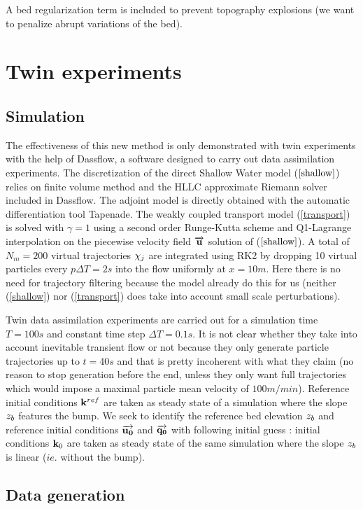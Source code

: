 A bed regularization term is included to prevent topography explosions (we want to penalize abrupt variations of the bed).

\clearpage
\section{Twin experiments}

\subsection{Simulation}

The effectiveness of this new method is only demonstrated with twin experiments with the help of Dassflow,
a software designed to carry out data assimilation experiments.
The discretization of the direct Shallow Water model ($\ref{shallow}$) relies on finite volume method and the HLLC approximate Riemann solver included in Dassflow.
The adjoint model is directly obtained with the automatic differentiation tool Tapenade.
The weakly coupled transport model (\ref{transport}) is solved with $\gamma = 1$ using a second order Runge-Kutta scheme and Q1-Lagrange interpolation on the piecewise velocity field $\overrightarrow{\mathbf{u}}$ solution of ($\ref{shallow}$).
A total of $N_m = 200$ virtual trajectories $\mathbf{\chi}_j$ are integrated using RK2 by dropping 10 virtual particles every $p\Delta T = 2s$ into the flow uniformly at $x=10m$.
Here there is no need for trajectory filtering because the model already do this for us (neither (\ref{shallow}) nor (\ref{transport}) does take into account small scale perturbations).


\vskip 0.3cm
Twin data assimilation experiments are carried out for a simulation time $T = 100s$ and constant time step $\Delta T = 0.1s$. It is not clear whether they take into account inevitable transient flow or not because they only generate particle trajectories up to $t = 40s$ and that is pretty incoherent with what they claim (no reason to stop generation before the end, unless they only want full trajectories which would impose a maximal particle mean velocity of $100m/min$).
Reference initial conditions $\mathbf{k}^{ref}$ are taken as steady state of a simulation where the slope $z_b$ features the bump.
We seek to identify the reference bed elevation $z_b$ and reference initial conditions $\overrightarrow{\mathbf{u_0}}$ and $\overrightarrow{\mathbf{q_0}}$ with following initial guess :
initial conditions $\mathbf{k}_0$ are taken as steady state of the same simulation where the slope $z_b$ is linear ($ie.$ without the bump).

\subsection{Data generation}

